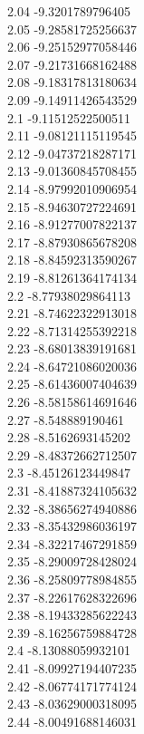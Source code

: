 {2.04	-9.3201789796405\\
2.05	-9.28581725256637\\
2.06	-9.25152977058446\\
2.07	-9.21731668162488\\
2.08	-9.18317813180634\\
2.09	-9.14911426543529\\
2.1	-9.11512522500511\\
2.11	-9.08121115119545\\
2.12	-9.04737218287171\\
2.13	-9.01360845708455\\
2.14	-8.97992010906954\\
2.15	-8.94630727224691\\
2.16	-8.91277007822137\\
2.17	-8.87930865678208\\
2.18	-8.84592313590267\\
2.19	-8.81261364174134\\
2.2	-8.77938029864113\\
2.21	-8.74622322913018\\
2.22	-8.71314255392218\\
2.23	-8.68013839191681\\
2.24	-8.64721086020036\\
2.25	-8.61436007404639\\
2.26	-8.58158614691646\\
2.27	-8.548889190461\\
2.28	-8.5162693145202\\
2.29	-8.48372662712507\\
2.3	-8.45126123449847\\
2.31	-8.41887324105632\\
2.32	-8.38656274940886\\
2.33	-8.35432986036197\\
2.34	-8.32217467291859\\
2.35	-8.29009728428024\\
2.36	-8.25809778984855\\
2.37	-8.22617628322696\\
2.38	-8.19433285622243\\
2.39	-8.16256759884728\\
2.4	-8.13088059932101\\
2.41	-8.09927194407235\\
2.42	-8.06774171774124\\
2.43	-8.03629000318095\\
2.44	-8.00491688146031\\
}
